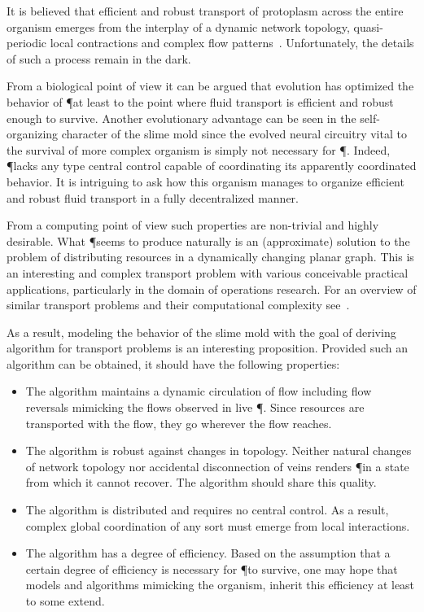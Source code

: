   It is believed that efficient and robust transport of protoplasm across the entire organism emerges from the interplay of a dynamic network topology, quasi-periodic local contractions and complex flow patterns~\cite{alim2013random,teplov1991continuum}. Unfortunately, the details of such a process remain in the dark.

  From a biological point of view it can be argued that evolution has optimized the behavior of \P at least to the point where fluid transport is efficient and robust enough to survive. Another evolutionary advantage can be seen in the self-organizing character of the slime mold since the evolved neural circuitry vital to the survival of more complex organism is simply not necessary for \P. Indeed, \P lacks any type central control capable of coordinating its apparently coordinated behavior. It is intriguing to ask how this organism manages to organize efficient and robust fluid transport in a fully decentralized manner.

  From a computing point of view such properties are non-trivial and highly desirable. What \P seems to produce naturally is an (approximate) solution to the problem of distributing resources in a dynamically changing planar graph. This is an interesting and complex transport problem with various conceivable practical applications, particularly in the domain of operations research. For an overview of similar transport problems and their computational complexity see~\cite{Ausiello:1999:CAC:554706,4567876,Hillier:1986:IOR:27036}.

  As a result, modeling the behavior of the slime mold with the goal of deriving algorithm for transport problems is an interesting proposition. Provided such an algorithm can be obtained, it should have the following properties:

  \begin{itemize}
  \item The algorithm maintains a dynamic circulation of flow including flow reversals mimicking the flows observed in live \P. Since resources are transported with the flow, they go wherever the flow reaches.
  \item The algorithm is robust against changes in topology. Neither natural changes of network topology nor accidental disconnection of veins renders \P in a state from which it cannot recover. The algorithm should share this quality.
  \item The algorithm is distributed and requires no central control. As a result, complex global coordination of any sort must emerge from local interactions.
  \item The algorithm has a degree of efficiency. Based on the assumption that a certain degree of efficiency is necessary for \P to survive, one may hope that models and algorithms mimicking the organism, inherit this efficiency at least to some extend.
  \end{itemize}

